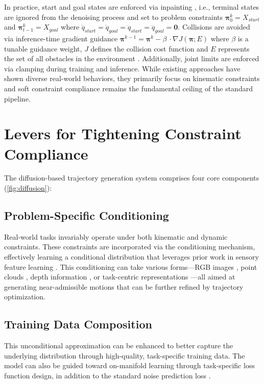 In practice, start and goal states are enforced via inpainting \cite{carvalho2023motion}, i.e., terminal states are ignored from the denoising process and set to problem constraints $\bm{\pi}_0^k = X_{start}$ and $\bm{\pi}_{t-1}^k = X_{goal}$ where $\dot{q}_{start} = \dot{q}_{goal} = \ddot{q}_{start} = \ddot{q}_{goal} = \bm{0}$.
Collisions are avoided via inference-time gradient guidance $\bm{\pi}^{k-1} = \bm{\pi}^k - \beta\ \cdot \nabla J(\bm{\pi}; E)$ where $\beta$ is a tunable guidance weight, $J$ defines the collision cost function and $E$ represents the set of all obstacles in the environment \cite{saha2024edmp}.
Additionally, joint limits are enforced via clamping during training and inference.
While existing approaches have shown diverse real-world behaviors, they primarily focus on kinematic constraints and soft constraint compliance remains the fundamental ceiling of the standard pipeline.

\section{Levers for Tightening Constraint Compliance}
\label{sec:generation:levers}

The diffusion-based trajectory generation system comprises four core components (\cref{fig:diffusion}):

\subsection{Problem-Specific Conditioning}
\label{sec:generation:conditioning}

Real-world tasks invariably operate under both kinematic and dynamic constraints. These constraints are incorporated via the conditioning mechanism, effectively learning a conditional distribution that leverages prior work in sensory feature learning \cite{krizhevsky2012imagenet}. This conditioning can take various forms---RGB images \cite{chi2023diffusionpolicy,sridhar2024nomad}, point clouds \cite{ze20243d}, depth information \cite{huang2024diffusionseeder}, or task-centric representations \cite{seo2024presto}---all aimed at generating near-admissible motions that can be further refined by trajectory optimization.

\subsection{Training Data Composition}
\label{sec:generation:data}

This unconditional approximation can be enhanced to better capture the underlying distribution through high-quality, task-specific training data. The model can also be guided toward on-manifold learning through task-specific loss function design, in addition to the standard noise prediction loss \cite{chi2023diffusionpolicy,saha2024edmp,carvalho2023motion}.

